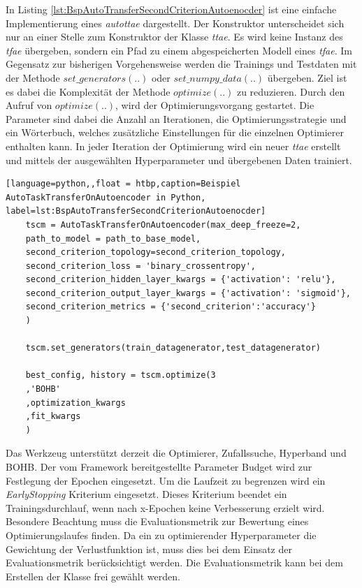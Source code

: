 	In Listing \ref{lst:BspAutoTransferSecondCriterionAutoenocder} ist eine einfache Implementierung eines \textit{\acl{autottae}} dargestellt. Der Konstruktor unterscheidet sich nur an einer Stelle zum Konstruktor der Klasse \textit{\acl{ttae}}. Es wird keine Instanz des \textit{\ac{tfae}} übergeben, sondern ein Pfad zu einem abgespeicherten Modell eines \textit{\ac{tfae}}. 
	Im Gegensatz zur bisherigen Vorgehensweise werden die Trainings und Testdaten mit der Methode $set\_generators(..)$  oder $set\_numpy\_data(..)$ übergeben. Ziel ist es dabei die Komplexität der Methode $optimize(..)$ zu reduzieren. Durch den Aufruf von $optimize(..)$, wird der Optimierungsvorgang gestartet. Die Parameter sind dabei die Anzahl an Iterationen, die Optimierungsstrategie und ein Wörterbuch, welches zusätzliche Einstellungen für die einzelnen Optimierer enthalten kann. In jeder Iteration der Optimierung wird ein neuer  \textit{\acl{ttae}} erstellt und mittels der ausgewählten Hyperparameter und übergebenen Daten trainiert. 
	\begin{lstlisting}[language=python,,float = htbp,caption=Beispiel AutoTaskTransferOnAutoencoder in Python, label=lst:BspAutoTransferSecondCriterionAutoenocder]
	tscm = AutoTaskTransferOnAutoencoder(max_deep_freeze=2,
	path_to_model = path_to_base_model,            
	second_criterion_topology=second_criterion_topology,
	second_criterion_loss = 'binary_crossentropy',                                                                                                   
	second_criterion_hidden_layer_kwargs = {'activation': 'relu'},
	second_criterion_output_layer_kwargs = {'activation': 'sigmoid'},
	second_criterion_metrics = {'second_criterion':'accuracy'}
	)
	
	tscm.set_generators(train_datagenerator,test_datagenerator)
	
	best_config, history = tscm.optimize(3
	,'BOHB'
	,optimization_kwargs
	,fit_kwargs
	)
	\end{lstlisting}
	Das Werkzeug unterstützt derzeit die Optimierer, Zufallssuche, Hyperband und BOHB. Der vom Framework bereitgestellte Parameter Budget wird zur Festlegung der Epochen eingesetzt. Um die Laufzeit zu begrenzen wird ein \textit{EarlyStopping} Kriterium eingesetzt. Dieses Kriterium beendet ein Trainingsdurchlauf, wenn nach x-Epochen keine Verbesserung erzielt wird.
	Besondere Beachtung muss die Evaluationsmetrik zur Bewertung eines Optimierungslaufes finden. Da ein zu optimierender Hyperparameter die Gewichtung der Verlustfunktion ist, muss dies bei dem Einsatz der Evaluationsmetrik berücksichtigt werden. Die Evaluationsmetrik kann bei dem Erstellen der Klasse frei gewählt werden.
	
